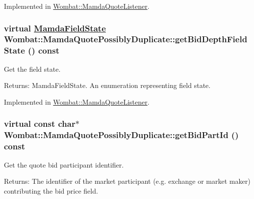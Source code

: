 Implemented in \hyperlink{classWombat_1_1MamdaQuoteListener_3f4909f6e25bef5324df4c4fa89bda74}{Wombat::Mamda\-Quote\-Listener}.\hypertarget{classWombat_1_1MamdaQuotePossiblyDuplicate_4b1d107fcfe64b924befd77fe85bd953}{
\subsubsection[getBidDepthFieldState]{\setlength{\rightskip}{0pt plus 5cm}virtual \hyperlink{namespaceWombat_93aac974f2ab713554fd12a1fa3b7d2a}{Mamda\-Field\-State} Wombat::Mamda\-Quote\-Possibly\-Duplicate::get\-Bid\-Depth\-Field\-State () const}}
\label{classWombat_1_1MamdaQuotePossiblyDuplicate_4b1d107fcfe64b924befd77fe85bd953}


Get the field state. 

\begin{Desc}
\item[Returns:]Mamda\-Field\-State. An enumeration representing field state. \end{Desc}


Implemented in \hyperlink{classWombat_1_1MamdaQuoteListener_98c0e8e6190f6cb27684fd9abcf4a356}{Wombat::Mamda\-Quote\-Listener}.\hypertarget{classWombat_1_1MamdaQuotePossiblyDuplicate_fed97084e8d88c1c9aefb5dfb85d8105}{
\subsubsection[getBidPartId]{\setlength{\rightskip}{0pt plus 5cm}virtual const char$\ast$ Wombat::Mamda\-Quote\-Possibly\-Duplicate::get\-Bid\-Part\-Id () const}}
\label{classWombat_1_1MamdaQuotePossiblyDuplicate_fed97084e8d88c1c9aefb5dfb85d8105}


Get the quote bid participant identifier. 

\begin{Desc}
\item[Returns:]The identifier of the market participant (e.g. exchange or market maker) contributing the bid price field. \end{Desc}


